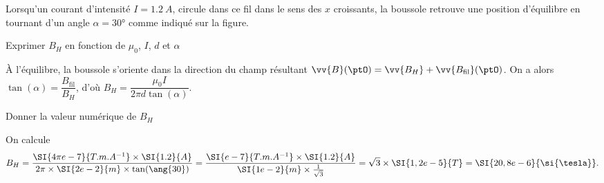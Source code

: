 \smallskip

Lorsqu'un courant d'intensité $I=\SI{1.2}{A}$, circule dans ce fil dans le sens des $x$ croissants, 
la boussole retrouve une position d'équilibre en tournant d'un angle $\alpha=\ang{30}$ comme indiqué sur la figure.


\medskip

\debutEntrainement



\begin{enonce}
Exprimer $B_{H}$ en fonction de $\mu_{0}$,  $I$, $d$ et $\alpha$%
\end{enonce}


\begin{corrige}
À l'équilibre, la boussole s'oriente dans la direction du champ résultant
$\vv{B}(\ptO)=\vv{B_H}+\vv{B_{\text{fil}}}(\ptO)$. On a alors $\tan(\alpha)=\dfrac{B_{\text{fil}}}{B_H}$, d'où $B_{H}=\dfrac{\mu_0 I}{2 \pi d \tan(\alpha)}$.
\end{corrige}



\begin{enonce}
Donner la valeur numérique de $B_{H}$
\end{enonce}


\begin{corrige} 
On calcule \minusSmallskip
\[
B_H
=\frac{\SI{4\pi e-7}{T.m.A^{-1}} \times \SI{1.2}{A}}{2\pi \times \SI{2e-2}{m} \times \tan(\ang{30})}
=\frac{\SI{ e-7}{T.m.A^{-1}} \times \SI{1.2}{A}}{\SI{1e-2}{m} \times \frac{1}{\sqrt{3}} }
=\sqrt{3}\times \SI{1,2  e-5}{T}=
\SI{20,8 e-6}{\si{\tesla}}.
\]
\end{corrige}


\finEntrainement


